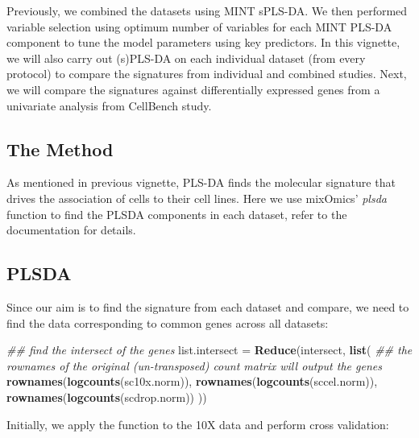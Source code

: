 \documentclass[]{book}
\newenvironment{Shaded}{\begin{snugshade}}{\end{snugshade}}
\newcommand{\CommentTok}[1]{\textcolor[rgb]{0.56,0.35,0.01}{\textit{#1}}}
\newcommand{\KeywordTok}[1]{\textcolor[rgb]{0.13,0.29,0.53}{\textbf{#1}}}
\newcommand{\NormalTok}[1]{#1}
\newcommand{\StringTok}[1]{\textcolor[rgb]{0.31,0.60,0.02}{#1}}
\theoremstyle{definition}
\theoremstyle{definition}
\theoremstyle{definition}
\theoremstyle{remark}
\begin{document}
Previously, we combined the datasets using MINT sPLS-DA. We then
performed variable selection using optimum number of variables for each
MINT PLS-DA component to tune the model parameters using key predictors.
In this vignette, we will also carry out (s)PLS-DA on each individual
dataset (from every protocol) to compare the signatures from individual
and combined studies. Next, we will compare the signatures against
differentially expressed genes from a univariate analysis from CellBench
study.

\hypertarget{the-method}{%
\subsection{The Method}\label{the-method}}

As mentioned in previous vignette, PLS-DA finds the molecular signature
that drives the association of cells to their cell lines. Here we use
mixOmics' \emph{plsda} function to find the PLSDA components in each
dataset, refer to the documentation for details.

\hypertarget{plsda}{%
\subsection{PLSDA}\label{plsda}}

Since our aim is to find the signature from each dataset and compare, we
need to find the data corresponding to common genes across all datasets:

\begin{Shaded}
\begin{Highlighting}[]
\CommentTok{## find the intersect of the genes}
\NormalTok{list.intersect =}\StringTok{ }\KeywordTok{Reduce}\NormalTok{(intersect, }\KeywordTok{list}\NormalTok{(}
\CommentTok{## the rownames of the original (un-transposed) count matrix will output the genes}
  \KeywordTok{rownames}\NormalTok{(}\KeywordTok{logcounts}\NormalTok{(sc10x.norm)),}
  \KeywordTok{rownames}\NormalTok{(}\KeywordTok{logcounts}\NormalTok{(sccel.norm)),}
  \KeywordTok{rownames}\NormalTok{(}\KeywordTok{logcounts}\NormalTok{(scdrop.norm))}
\NormalTok{))}
\end{Highlighting}
\end{Shaded}

Initially, we apply the function to the 10X data and perform cross
validation:
\end{document}
